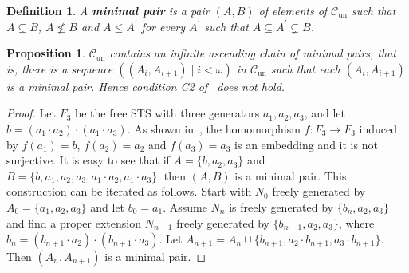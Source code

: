 \documentclass[a4paper, 11pt]{article}
\newcommand{\Cun}{\mathcal{C}_\mathrm{un}}
\theoremstyle{note}
\newtheorem{df}[thm]{Definition}
\newtheorem{prop}[thm]{Proposition}
\begin{document}
\begin{df}
	A \textbf{minimal pair} is a pair $(A,B)$ of elements of $\Cun$ such that $A\subsetneq B$, $A\not\leq B$ and $A\leq A^\prime$ for every $A^\prime$ such that $A\subseteq A^\prime\subsetneq B$.
\end{df}

\begin{prop}
	$\Cun$ contains an infinite ascending chain of minimal pairs, that is, there is a sequence $((A_i,A_{i+1})\mid i<\omega)$ in $\Cun$  such that each $(A_i,A_{i+1})$ is a minimal pair. Hence condition C2 of~\cite{wagner} does not hold.
\end{prop}
\begin{proof} Let $F_3$ be the free STS with three generators $a_1,a_2,a_3$, and let $b=(a_1\cdot a_2)\cdot (a_1\cdot a_3)$. As shown in~\cite{barcas2}, the homomorphism $f:F_3\rightarrow F_3$  induced by $f(a_1)=b$, $f(a_2)=a_2$ and $f(a_3)=a_3$ is an embedding and it is not surjective. It is easy to see that if $A=\{b,a_2,a_3\}$ and $B=\{b,a_1,a_2,a_3, a_1\cdot a_2, a_1\cdot a_3\}$, then $(A,B)$ is a minimal pair. This construction can be iterated as follows.  Start with $N_0$ freely generated by $A_0=\{a_1,a_2,a_3\}$ and let $b_0= a_1$. Assume $N_n$ is freely generated by $\{b_n,a_2,a_3\}$  and find a proper extension $N_{n+1}$  freely generated by $\{b_{n+1},a_2,a_3\}$, where $b_n= (b_{n+1}\cdot a_2)\cdot(b_{n+1} \cdot a_3)$. Let $A_{n+1}= A_n\cup\{b_{n+1},a_2\cdot b_{n+1}, a_3\cdot b_{n+1}\}$. Then $(A_n,A_{n+1})$ is a minimal pair.
	
\end{proof}	
	
\end{document}
